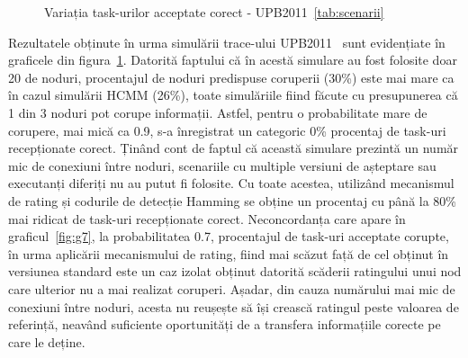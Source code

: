 \documentclass[12pt,a4paper]{report}
\begin{document}
\begin{figure}%
    \centering
    \qquad
    \caption{Variația task-urilor acceptate corect - UPB2011~\ref{tab:scenarii}}%
    \label{fig:metric12UPB2011}%
\end{figure}

Rezultatele obținute în urma simulării trace-ului UPB2011~\cite{upb2011} sunt evidențiate în graficele din figura~\ref{fig:metric12UPB2011}. Datorită faptului că în acestă simulare au fost folosite doar 20 de noduri, procentajul de noduri predispuse coruperii (30\%) este mai mare ca în cazul simulării HCMM (26\%), toate simulăriile fiind făcute cu presupunerea că 1 din 3 noduri pot corupe informații. Astfel, pentru o probabilitate mare de corupere, mai mică ca 0.9, s-a înregistrat un categoric 0\% procentaj de task-uri recepționate corect. Ținând cont de faptul că această simulare prezintă un număr mic de conexiuni între noduri, scenariile cu multiple versiuni de așteptare sau executanți diferiți nu au putut fi folosite. Cu toate acestea, utilizând mecanismul de rating și codurile de detecție Hamming se obține un procentaj cu până la 80\% mai ridicat de task-uri recepționate corect. Neconcordanța care apare în graficul~\ref{fig:g7}, la probabilitatea 0.7, procentajul de task-uri acceptate corupte, în urma aplicării mecanismului de rating, fiind mai scăzut față de cel obținut în versiunea standard este un caz izolat obținut datorită scăderii ratingului unui nod care ulterior nu a mai realizat coruperi. Așadar, din cauza numărului mai mic de conexiuni între noduri, acesta nu reușește să își crească ratingul peste valoarea de referință, neavând suficiente oportunități de a transfera informațiile corecte pe care le deține.
\end{document}

